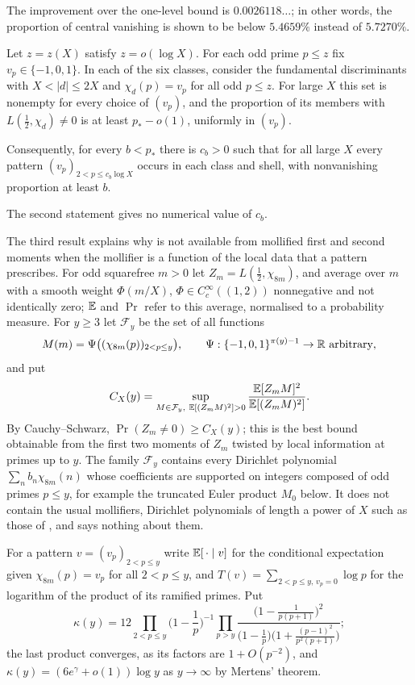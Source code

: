 \documentclass[11pt,colorlinks]{charlie}
\newcommand{\pstar}{p_\ast}
\begin{document}
The improvement over the one-level bound is $0.0026118\ldots$; in other words, the proportion of central vanishing is shown to be below $5.4659\%$ instead of $5.7270\%$.

\begin{theorem}\label{thm:local}
Let $z=z(X)$ satisfy $z=o(\log X)$. For each odd prime $p\le z$ fix $v_p\in\{-1,0,1\}$. In each of the six classes, consider the fundamental discriminants with $X<|d|\le2X$ and $\chi_d(p)=v_p$ for all odd $p\le z$. For large $X$ this set is nonempty for every choice of $(v_p)$, and the proportion of its members with $L(\tfrac12,\chi_d)\neq0$ is at least $\pstar-o(1)$, uniformly in $(v_p)$.

Consequently, for every $b<\pstar$ there is $c_b>0$ such that for all large $X$ every pattern $(v_p)_{2<p\le c_b\log X}$ occurs in each class and shell, with nonvanishing proportion at least $b$.
\end{theorem}

The second statement gives no numerical value of $c_b$.

The third result explains why  is not available from mollified first and second moments when the mollifier is a function of the local data that a pattern prescribes. For odd squarefree $m>0$ let $Z_m=L(\tfrac12,\chi_{8m})$, and average over $m$ with a smooth weight $\Phi(m/X)$, $\Phi\in C_c^\infty((1,2))$ nonnegative and not identically zero; $\mathbb{E}$ and $\Pr$ refer to this average, normalised to a probability measure. For $y\ge3$ let $\mathcal F_y$ be the set of all functions
\[
 M(m)=\Psi\big((\chi_{8m}(p))_{2<p\le y}\big),\qquad\Psi:\{-1,0,1\}^{\pi(y)-1}\to\R\ \text{arbitrary},
\]
and put
\[
 C_X(y)=\sup_{M\in\mathcal F_y,\ \E[(Z_mM)^2]>0}\frac{\E[Z_mM]^2}{\E[(Z_mM)^2]}.
\]
By Cauchy--Schwarz, $\Pr(Z_m\neq0)\ge C_X(y)$; this is the best bound obtainable from the first two moments of $Z_m$ twisted by local information at primes up to $y$. The family $\mathcal F_y$ contains every Dirichlet polynomial $\sum_nb_n\chi_{8m}(n)$ whose coefficients are supported on integers composed of odd primes $p\le y$, for example the truncated Euler product $M_0$ below. It does not contain the usual mollifiers, Dirichlet polynomials of length a power of $X$ such as those of \cite{Sound}, and  says nothing about them.

For a pattern $v=(v_p)_{2<p\le y}$ write $\mathbb{E}[\,\cdot\mid v]$ for the conditional expectation given $\chi_{8m}(p)=v_p$ for all $2<p\le y$, and $T(v)=\sum_{2<p\le y,\,v_p=0}\log p$ for the logarithm of the product of its ramified primes. Put
\begin{equation}\label{eq:kappa}
 \kappa(y)=12\prod_{2<p\le y}\Big(1-\frac1p\Big)^{-1}\prod_{p>y}\frac{\big(1-\frac1{p(p+1)}\big)^2}{\big(1-\frac1p\big)\big(1+\frac{(p-1)^2}{p^2(p+1)}\big)} ;
\end{equation}
the last product converges, as its factors are $1+O(p^{-2})$, and $\kappa(y)=(6e^\gamma+o(1))\log y$ as $y\to\infty$ by Mertens' theorem.
\end{document}
